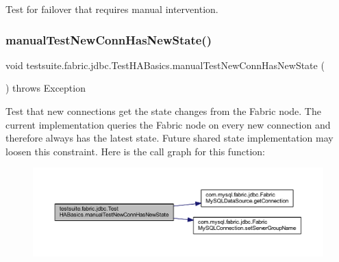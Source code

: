 Test for failover that requires manual intervention. \mbox{\label{classtestsuite_1_1fabric_1_1jdbc_1_1_test_h_a_basics_a46bc7c088ffa04246b0cf08add9694d6}} 
\subsubsection{\texorpdfstring{manual\+Test\+New\+Conn\+Has\+New\+State()}{manualTestNewConnHasNewState()}}
{\footnotesize\ttfamily void testsuite.\+fabric.\+jdbc.\+Test\+H\+A\+Basics.\+manual\+Test\+New\+Conn\+Has\+New\+State (\begin{DoxyParamCaption}{ }\end{DoxyParamCaption}) throws Exception}

Test that new connections get the state changes from the Fabric node. The current implementation queries the Fabric node on every new connection and therefore always has the latest state. Future shared state implementation may loosen this constraint. Here is the call graph for this function\+:
\nopagebreak
\begin{figure}[H]
\begin{center}
\leavevmode
\includegraphics[width=350pt]{classtestsuite_1_1fabric_1_1jdbc_1_1_test_h_a_basics_a46bc7c088ffa04246b0cf08add9694d6_cgraph}
\end{center}
\end{figure}
\mbox{\label{classtestsuite_1_1fabric_1_1jdbc_1_1_test_h_a_basics_a7403ca8813b62ba5c1107ab80bed7f02}} 
